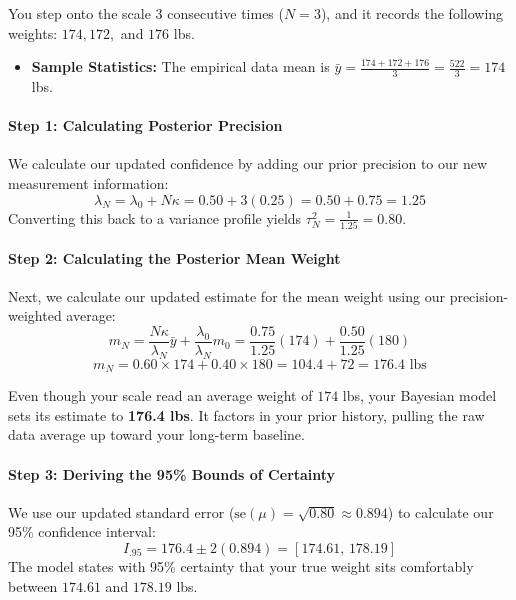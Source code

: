\documentclass{article}
\begin{document}
You step onto the scale $3$ consecutive times ($N=3$), and it records the following weights: $174, 172,$ and $176$ lbs.
\begin{itemize}
    \item \textbf{Sample Statistics:} The empirical data mean is $\bar{y} = \frac{174 + 172 + 176}{3} = \frac{522}{3} = 174$ lbs.
\end{itemize}

\paragraph{Step 1: Calculating Posterior Precision}
We calculate our updated confidence by adding our prior precision to our new measurement information:
\begin{equation}
\lambda_N = \lambda_0 + N\kappa = 0.50 + 3(0.25) = 0.50 + 0.75 = 1.25
\end{equation}
Converting this back to a variance profile yields $\tau_N^2 = \frac{1}{1.25} = 0.80$.

\paragraph{Step 2: Calculating the Posterior Mean Weight}
Next, we calculate our updated estimate for the mean weight using our precision-weighted average:
\begin{equation}
m_N = \frac{N\kappa}{\lambda_N}\bar{y} + \frac{\lambda_0}{\lambda_N}m_0 = \frac{0.75}{1.25}(174) + \frac{0.50}{1.25}(180)
\end{equation}
\begin{equation}
m_N = 0.60 \times 174 + 0.40 \times 180 = 104.4 + 72 = 176.4\text{ lbs}
\end{equation}

Even though your scale read an average weight of $174$ lbs, your Bayesian model sets its estimate to \textbf{176.4 lbs}. It factors in your prior history, pulling the raw data average up toward your long-term baseline.

\paragraph{Step 3: Deriving the 95\% Bounds of Certainty}
We use our updated standard error ($\text{se}(\mu) = \sqrt{0.80} \approx 0.894$) to calculate our 95\% confidence interval:
\begin{equation}
I_{.95} = 176.4 \pm 2(0.894) = [174.61, \, 178.19]
\end{equation}
The model states with 95\% certainty that your true weight sits comfortably between $174.61$ and $178.19$ lbs.
\end{document}
